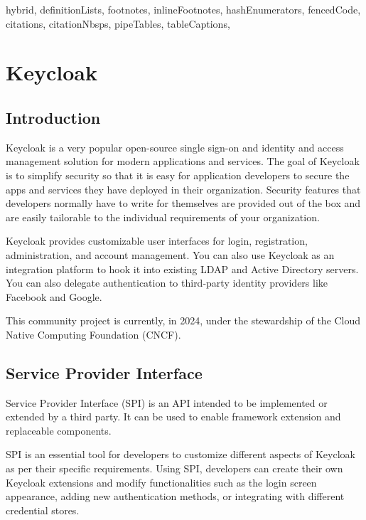 \documentclass[
  digital,     %
  oneside,     %
  nosansbold,  %
  nocolorbold, %
  lof,         %
  lot,         %
]{fithesis4}
\begin{document}
\begin{markdown*}{%
  hybrid,
  definitionLists,
  footnotes,
  inlineFootnotes,
  hashEnumerators,
  fencedCode,
  citations,
  citationNbsps,
  pipeTables,
  tableCaptions,
}


\newpage

\chapter{Keycloak}

\section{Introduction}
Keycloak is a very popular open-source single sign-on and identity and access management solution for modern applications and services.
The goal of Keycloak is to simplify security so that it is easy for application developers to secure the apps and services they have deployed in their organization.
Security features that developers normally have to write for themselves are provided out of the box and are easily tailorable to the individual requirements of your organization.

Keycloak provides customizable user interfaces for login, registration, administration, and account management.
You can also use Keycloak as an integration platform to hook it into existing LDAP and Active Directory servers.
You can also delegate authentication to third-party identity providers like Facebook and Google.

This community project is currently, in 2024, under the stewardship of the Cloud Native Computing Foundation (CNCF).\cite{keycloak-web}


\newpage
\section{Service Provider Interface}
Service Provider Interface (SPI) is an API intended to be implemented or extended by a third party.
It can be used to enable framework extension and replaceable components.\cite{keycloak-spi}

SPI is an essential tool for developers to customize different aspects of Keycloak as per their specific requirements.
Using SPI, developers can create their own Keycloak extensions and modify functionalities such as the login screen appearance, adding new authentication methods, or integrating with different credential stores.


\end{markdown*}
\end{document}
